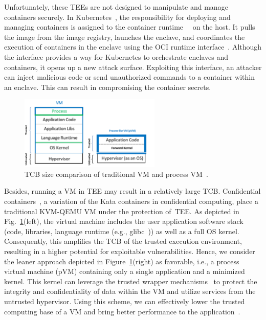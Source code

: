 Unfortunately, these \acrshort{TEE}s are not designed to manipulate and manage containers securely. In Kubernetes~\cite*{k8s}, the responsibility for deploying and managing containers is assigned to the container runtime~\cite*{containerd}~\cite*{cri-o} on the host. It pulls the image from the image registry, launches the enclave, and coordinates the 
execution of containers in the enclave using the OCI runtime interface~\cite*{oci-runtime-spec}. Although the interface provides a way for Kubernetes to orchestrate enclaves and containers, it opens up a new attack surface. Exploiting this interface, an attacker can inject malicious code or send unauthorized commands to 
a container within an enclave. This can result in compromising the container secrets.
 
 
\begin{figure}[!htb]
  \centering
  \includegraphics[width=0.6\textwidth]{images/VM_vs_PVM.png}
  \caption[TCB size comparison of traditional VM and process VM]{TCB size comparison of traditional VM and process VM~\cite*{10.1145/3436512}.}
  \label{fig:VM_vs_PVM}
\end{figure}
 
Besides, running a VM in \acrshort{TEE}  may result in a relatively large \acrshort{TCB}. Confidential containers~\cite*{confidential_kata}, a variation of the Kata containers in confidential computing, place a traditional KVM-QEMU VM under the protection of~\acrshort{TEE}. As depicted in Fig.~\ref{fig:VM_vs_PVM}(left), the virtual machine includes the 
user application software stack (code, libraries, language runtime (e.g., glibc~\cite*{glibc})) as well as a full OS kernel. Consequently, this amplifies the \acrshort{TCB} of the trusted execution environment, resulting in a higher potential for exploitable vulnerabilities. Hence, we consider 
the leaner approach depicted in Figure~\ref{fig:VM_vs_PVM}(right) as favorable, i.e., a process virtual machine (\acrshort{pVM}) containing only a single application and a minimized kernel. This kernel can leverage the trusted wrapper mechanisms~\cite*{Hoekstra2013UsingII} to protect the integrity and confidentiality of data within the VM and utilize services 
from the untrusted hypervisor. Using this scheme, we can effectively lower the trusted computing base of a VM and bring better performance to the application~\cite*{quark_performance_report}.
 

